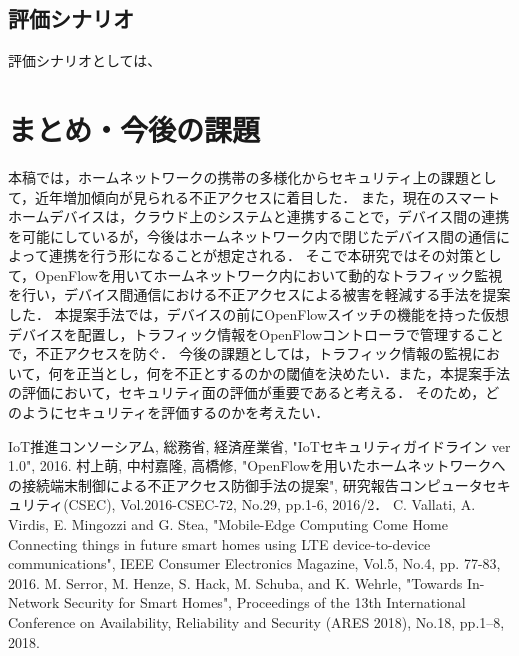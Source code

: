\documentclass[a4paper,10pt,twocolumn,uplatex]{jsarticle}
\begin{document}
\subsection{評価シナリオ}
評価シナリオとしては、

\section{まとめ・今後の課題}
本稿では，ホームネットワークの携帯の多様化からセキュリティ上の課題として，近年増加傾向が見られる不正アクセスに着目した．
また，現在のスマートホームデバイスは，クラウド上のシステムと連携することで，デバイス間の連携を可能にしているが，今後はホームネットワーク内で閉じたデバイス間の通信によって連携を行う形になることが想定される．
そこで本研究ではその対策として，OpenFlowを用いてホームネットワーク内において動的なトラフィック監視を行い，デバイス間通信における不正アクセスによる被害を軽減する手法を提案した．
本提案手法では，デバイスの前にOpenFlowスイッチの機能を持った仮想デバイスを配置し，トラフィック情報をOpenFlowコントローラで管理することで，不正アクセスを防ぐ．
今後の課題としては，トラフィック情報の監視において，何を正当とし，何を不正とするのかの閾値を決めたい．また，本提案手法の評価において，セキュリティ面の評価が重要であると考える．
そのため，どのようにセキュリティを評価するのかを考えたい．

\footnotesize{
  \begin{thebibliography}{99}
     IoT推進コンソーシアム, 総務省, 経済産業省, "IoTセキュリティガイドライン ver 1.0", 2016.
     村上萌, 中村嘉隆, 高橋修, "OpenFlowを用いたホームネットワークへの接続端末制御による不正アクセス防御手法の提案", 研究報告コンピュータセキュリティ(CSEC), Vol.2016-CSEC-72, No.29, pp.1-6, 2016/2．
     C. Vallati, A. Virdis, E. Mingozzi and G. Stea, "Mobile-Edge Computing Come Home Connecting things in future smart homes using LTE device-to-device communications", IEEE Consumer Electronics Magazine, Vol.5, No.4, pp. 77-83, 2016.
     M. Serror, M. Henze, S. Hack, M. Schuba, and K. Wehrle, "Towards In-Network Security for Smart Homes", Proceedings of the 13th International Conference on Availability, Reliability and Security (ARES 2018), No.18, pp.1–8, 2018.
  \end{thebibliography}
}

\end{document}
